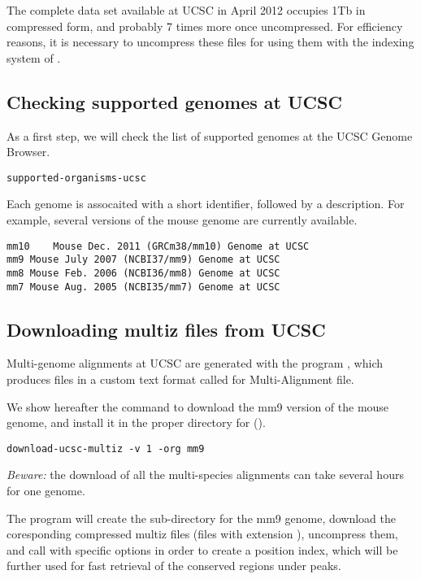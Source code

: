 The complete data set available at UCSC in April 2012 occupies 1Tb in
compressed form, and probably 7 times more once uncompressed. For
efficiency reasons, it is necessary to uncompress these files for
using them with the indexing system of .

\subsection{Checking supported genomes at UCSC}

As a first step, we will check the list of supported genomes at the
UCSC Genome Browser.

\begin{lstlisting}
supported-organisms-ucsc
\end{lstlisting}

Each genome is assocaited with a short identifier, followed by a
description. For example, several versions of the mouse genome are
currently available.

\begin{small}
\begin{verbatim}
mm10	Mouse Dec. 2011 (GRCm38/mm10) Genome at UCSC
mm9	Mouse July 2007 (NCBI37/mm9) Genome at UCSC
mm8	Mouse Feb. 2006 (NCBI36/mm8) Genome at UCSC
mm7	Mouse Aug. 2005 (NCBI35/mm7) Genome at UCSC
\end{verbatim}
\end{small}

\subsection{Downloading multiz files from UCSC}

Multi-genome alignments at UCSC are generated with the program
, which produces files in a custom text format called
 for Multi-Alignment file.

We show hereafter the command to download the mm9 version of the mouse
genome, and install it in the proper directory for
 ().

\begin{lstlisting}
download-ucsc-multiz -v 1 -org mm9
\end{lstlisting}

\emph{Beware: } the download of all the multi-species alignments can
take several hours for one genome.

The program will create the sub-directory for the mm9 genome, download
the coresponding compressed multiz files (files with extension
), uncompress them, and call 
with specific options in order to create a position index, which will
be further used for fast retrieval of the conserved regions under
peaks.

